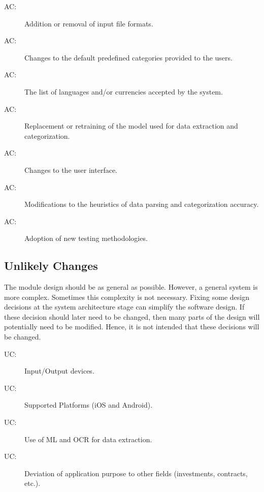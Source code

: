 \documentclass[12pt, titlepage]{article}
\newcounter{acnum}
\newcommand{\actheacnum}{AC\theacnum}
\newcounter{ucnum}
\newcommand{\uctheucnum}{UC\theucnum}
\begin{document}
\begin{description}
  \item[ \actheacnum \label{acInputs}:] Addition or removal of input file formats.
  \item[ \actheacnum \label{acCategories}:] Changes to the default predefined categories provided to the users.
  \item[ \actheacnum \label{acCurrencies}:] The list of languages and/or currencies accepted by the system.
  \item[ \actheacnum \label{acModel}:] Replacement or retraining of the model used for data extraction and categorization.
  \item[ \actheacnum \label{acInterface}:] Changes to the user interface.
  \item[ \actheacnum \label{acHeuristics}:] Modifications to the heuristics of data parsing and categorization accuracy.
  \item[ \actheacnum \label{acTesting}:] Adoption of new testing methodologies. 
\end{description}

\subsection{Unlikely Changes} \label{SecUchange}

The module design should be as general as possible. However, a general system is
more complex. Sometimes this complexity is not necessary. Fixing some design
decisions at the system architecture stage can simplify the software design. If
these decision should later need to be changed, then many parts of the design
will potentially need to be modified. Hence, it is not intended that these
decisions will be changed.


\begin{description}
  \item[ \uctheucnum \label{ucIO}:] Input/Output devices.
  \item[ \uctheucnum \label{ucPlatforms}:] Supported Platforms (iOS and Android).
  \item[ \uctheucnum \label{ucDataExtraction}:] Use of ML and OCR for data extraction.
  \item[ \uctheucnum \label{ucAppPurpose}:] Deviation of application purpose to other fields (investments, contracts, etc.).
  \end{description}
\end{document}
